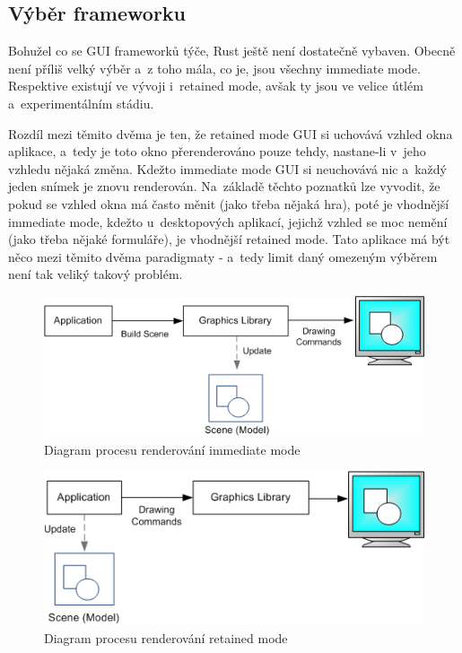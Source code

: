 \documentclass[a4paper, 12pt, twoside]{article} %
\begin{document}
	\subsection{Výběr frameworku}
		Bohužel co se GUI frameworků týče, Rust ještě není dostatečně vybaven. Obecně není příliš velký výběr a~z toho mála, co je, jsou všechny immediate mode. Respektive existují ve vývoji i~retained mode, avšak ty jsou ve velice útlém a~experimentálním stádiu.

		Rozdíl mezi těmito dvěma je ten, že retained mode GUI si uchovává vzhled okna aplikace, a~tedy je toto okno přerenderováno pouze tehdy, nastane-li v~jeho vzhledu nějaká změna. Kdežto immediate mode GUI si neuchovává nic a~každý jeden snímek je znovu renderován. Na~základě těchto poznatků lze vyvodit, že pokud se vzhled okna má často měnit (jako třeba nějaká hra), poté je vhodnější immediate mode, kdežto u~desktopových aplikací, jejichž vzhled se moc nemění (jako třeba nějaké formuláře), je vhodnější retained mode. Tato aplikace má být něco mezi těmito dvěma paradigmaty - a~tedy limit daný omezeným výběrem není tak veliký takový problém.
		\begin{center}
			\begin{figure}[H]
				\centering
				\includegraphics[width=.82\linewidth]{imm_mod}
				\caption{Diagram procesu renderování immediate mode\cite{imm_mod}}
				\label{fig:imm_mod}
			\end{figure}
		\end{center}
		\begin{center}
			\begin{figure}[H]
				\centering
				\includegraphics[width=.82\linewidth]{ret_mod}
				\caption{Diagram procesu renderování retained mode\cite{ret_mod}}
				\label{fig:ret_mod}
			\end{figure}
		\end{center}
		
\end{document}
